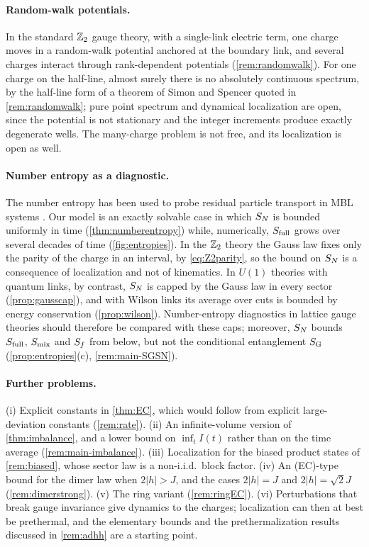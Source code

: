 \paragraph{Random-walk potentials.}
In the standard $\mathbb{Z}_2$ gauge theory, with a single-link electric term, one charge moves in a random-walk potential
anchored at the boundary link, and several charges interact through rank-dependent potentials
(\cref{rem:randomwalk}).  For one charge on the half-line, almost surely there is no absolutely continuous spectrum, by the
half-line form of a theorem of Simon and Spencer \cite{SimonSpencer1989} quoted in \cref{rem:randomwalk}; pure point
spectrum and dynamical localization are open, since the potential
is not stationary and the integer increments produce exactly degenerate wells.  The many-charge problem is not free,
and its localization is open as well.

\paragraph{Number entropy as a diagnostic.}
The number entropy has been used to probe residual particle transport in MBL systems
\cite{Lukin2019,KUFS2020}.  Our model is an exactly solvable case in which $S_{N}$ is bounded uniformly in time
(\cref{thm:numberentropy}) while, numerically, $S_{\mathrm{full}}$ grows over several decades of time (\cref{fig:entropies}).  In the $\mathbb{Z}_2$ theory the
Gauss law fixes only the parity of the charge in an interval, by \eqref{eq:Z2parity}, so the bound on $S_{N}$ is a
consequence of localization and not of kinematics.  In $U(1)$ theories with quantum links, by contrast, $S_{N}$ is
capped by the Gauss law in every sector (\cref{prop:gausscap}), and with Wilson links its average over cuts is bounded
by energy conservation (\cref{prop:wilson}).  Number-entropy diagnostics in lattice gauge theories should therefore be
compared with these caps; moreover, $S_{N}$ bounds $S_{\mathrm{full}}$, $S_{\mathrm{mix}}$ and $S_{f}$ from below, but not the conditional
entanglement $S_{\mathrm{G}}$ (\cref{prop:entropies}(c), \cref{rem:main-SGSN}).

\paragraph{Further problems.}
(i) Explicit constants in \cref{thm:EC}, which would follow from explicit large-deviation constants (\cref{rem:rate}).
(ii) An infinite-volume version of \cref{thm:imbalance}, and a lower bound on $\inf_tI(t)$ rather than on the time
average (\cref{rem:main-imbalance}).  (iii) Localization for the biased product states of \cref{rem:biased}, whose
sector law is a non-i.i.d.\ block factor.  (iv) An (EC)-type bound for the dimer law when $2|h|>J$, and the cases
$2|h|=J$ and $2|h|=\sqrt2J$ (\cref{rem:dimerstrong}).  (v) The ring variant (\cref{rem:ringEC}).  (vi) Perturbations
that break gauge invariance give dynamics to the charges; localization can then at best be prethermal, and the
elementary bounds and the prethermalization results discussed in \cref{rem:adhh} are a starting point.
